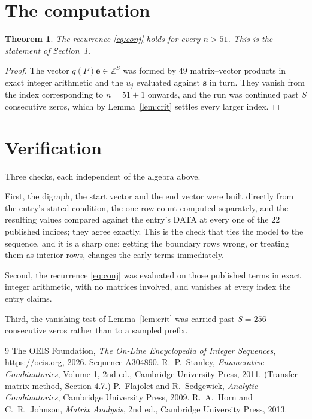 \documentclass[11pt,a4paper]{article}
\theoremstyle{plain}
\newtheorem{theorem}{Theorem}
\theoremstyle{definition}
\begin{document}
\section{The computation}

\begin{theorem}
The recurrence \eqref{eq:conj} holds for every $n>51$. This is the statement of
Section~1.
\end{theorem}

\begin{proof}
The vector $q(P)\mathbf{e}\in\mathbb{Z}^{S}$ was formed by $49$ matrix--vector
products in exact integer arithmetic and the $u_j$ evaluated against $\mathbf{s}$ in turn.
They vanish from the index corresponding to $n=51+1$ onwards, and the run was continued
past $S$ consecutive zeros, which by Lemma~\ref{lem:crit} settles every larger index.
\end{proof}

\section{Verification}

Three checks, each independent of the algebra above.

First, the digraph, the start vector and the end vector were built directly from the
entry's stated condition, the one-row count computed separately, and the resulting values
compared against the entry's DATA at every one of the $22$ published indices; they
agree exactly. This is the check that ties the model to the sequence, and it is a sharp one:
getting the boundary rows wrong, or treating them as interior rows, changes the early terms
immediately.

Second, the recurrence \eqref{eq:conj} was evaluated on those published terms in exact
integer arithmetic, with no matrices involved, and vanishes at every index the entry claims.

Third, the vanishing test of Lemma~\ref{lem:crit} was carried past $S=256$ consecutive
zeros rather than to a sampled prefix.

\begin{thebibliography}{9}
 The OEIS Foundation, \emph{The On-Line Encyclopedia of Integer
Sequences}, \url{https://oeis.org}, 2026. Sequence A304890.
 R.~P.~Stanley, \emph{Enumerative Combinatorics}, Volume 1, 2nd ed.,
Cambridge University Press, 2011. (Transfer-matrix method, Section 4.7.)
 P.~Flajolet and R.~Sedgewick, \emph{Analytic Combinatorics}, Cambridge
University Press, 2009.
 R.~A.~Horn and C.~R.~Johnson, \emph{Matrix Analysis}, 2nd ed., Cambridge
University Press, 2013.
\end{thebibliography}
\end{document}
